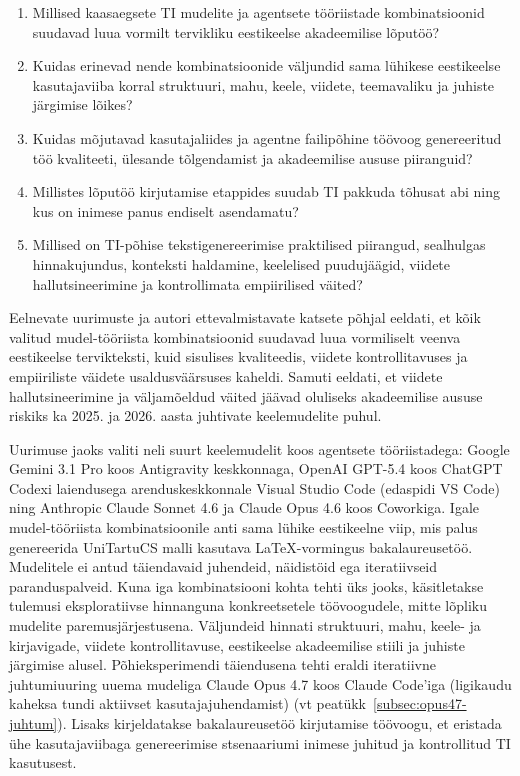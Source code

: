 \begin{enumerate}
    \item Millised kaasaegsete TI mudelite ja agentsete tööriistade kombinatsioonid suudavad luua vormilt tervikliku eestikeelse akadeemilise lõputöö?
    \item Kuidas erinevad nende kombinatsioonide väljundid sama lühikese eestikeelse kasutajaviiba korral struktuuri, mahu, keele, viidete, teemavaliku ja juhiste järgimise lõikes?
    \item Kuidas mõjutavad kasutajaliides ja agentne failipõhine töövoog genereeritud töö kvaliteeti, ülesande tõlgendamist ja akadeemilise aususe piiranguid?
    \item Millistes lõputöö kirjutamise etappides suudab TI pakkuda tõhusat abi ning kus on inimese panus endiselt asendamatu?
    \item Millised on TI-põhise tekstigenereerimise praktilised piirangud, sealhulgas hinnakujundus, konteksti haldamine, keelelised puudujäägid, viidete hallutsineerimine ja kontrollimata empiirilised väited?
\end{enumerate}

Eelnevate uurimuste \cite{liang2024mapping, mugaanyi2024citation, kim2025geographic} ja autori ettevalmistavate katsete põhjal eeldati, et kõik valitud mudel-tööriista kombinatsioonid suudavad luua vormiliselt veenva eestikeelse tervikteksti, kuid sisulises kvaliteedis, viidete kontrollitavuses ja empiiriliste väidete usaldusväärsuses kaheldi. Samuti eeldati, et viidete hallutsineerimine ja väljamõeldud väited jäävad oluliseks akadeemilise aususe riskiks ka 2025. ja 2026. aasta juhtivate keelemudelite puhul.

Uurimuse jaoks valiti neli suurt keelemudelit koos agentsete tööriistadega: Google Gemini 3.1 Pro koos Antigravity keskkonnaga, OpenAI GPT-5.4 koos ChatGPT Codexi laiendusega arenduskeskkonnale Visual Studio Code (edaspidi VS Code) ning Anthropic Claude Sonnet 4.6 ja Claude Opus 4.6 koos Coworkiga. Igale mudel-tööriista kombinatsioonile anti sama lühike eestikeelne viip, mis palus genereerida UniTartuCS malli kasutava \LaTeX{}-vormingus bakalaureusetöö. Mudelitele ei antud täiendavaid juhendeid, näidistöid ega iteratiivseid paranduspalveid. Kuna iga kombinatsiooni kohta tehti üks jooks, käsitletakse tulemusi eksploratiivse hinnanguna konkreetsetele töövoogudele, mitte lõpliku mudelite paremusjärjestusena. Väljundeid hinnati struktuuri, mahu, keele- ja kirjavigade, viidete kontrollitavuse, eestikeelse akadeemilise stiili ja juhiste järgimise alusel. Põhieksperimendi täiendusena tehti eraldi iteratiivne juhtumiuuring uuema mudeliga Claude Opus 4.7 koos Claude Code'iga (ligikaudu kaheksa tundi aktiivset kasutajajuhendamist) (vt peatükk~\ref{subsec:opus47-juhtum}). Lisaks kirjeldatakse bakalaureusetöö kirjutamise töövoogu, et eristada ühe kasutajaviibaga genereerimise stsenaariumi inimese juhitud ja kontrollitud TI kasutusest.

